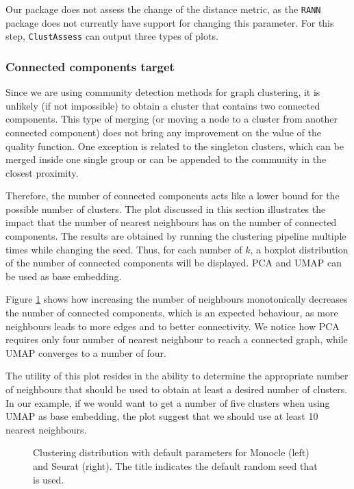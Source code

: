 Our package does not assess the change of the distance metric, as the \verb|RANN| package does not currently have support for changing this parameter.
For this step, \verb|ClustAssess| can output three types of plots.

\subsubsection{Connected components target}
Since we are using community detection methods for graph clustering, it is unlikely (if not impossible) to obtain a cluster that contains two connected components. This type of merging (or moving a node to a cluster from another connected component) does not bring any improvement on the value of the quality function. One exception is related to the singleton clusters, which can be merged inside one single group or can be appended to the community in the closest proximity.

Therefore, the number of connected components acts like a lower bound for the possible number of clusters. The plot discussed in this section illustrates the impact that the number of nearest neighbours has on the number of connected components. The results are obtained by running the clustering pipeline multiple times while changing the seed. Thus, for each number of $k$, a boxplot distribution of the number of connected components will be displayed. PCA and UMAP can be used as base embedding. 

Figure \ref{fig:ca-conn-comp} shows how increasing the number of neighbours monotonically decreases the number of connected components, which is an expected behaviour, as more neighbours leads to more edges and to better connectivity. We notice how PCA requires only four number of nearest neighbour to reach a connected graph, while UMAP converges to a number of four. 

The utility of this plot resides in the ability to determine the appropriate number of neighbours that should be used to obtain at least a desired number of clusters. In our example, if we would want to get a number of five clusters when using UMAP as base embedding, the plot suggest that we should use at least 10 nearest neighbours.

\begin{figure}[H]
    \centering
    \caption{\label{fig:ca-conn-comp}Clustering distribution with default parameters for Monocle (left) and Seurat (right). The title indicates the default random seed that is used.}
\end{figure}

